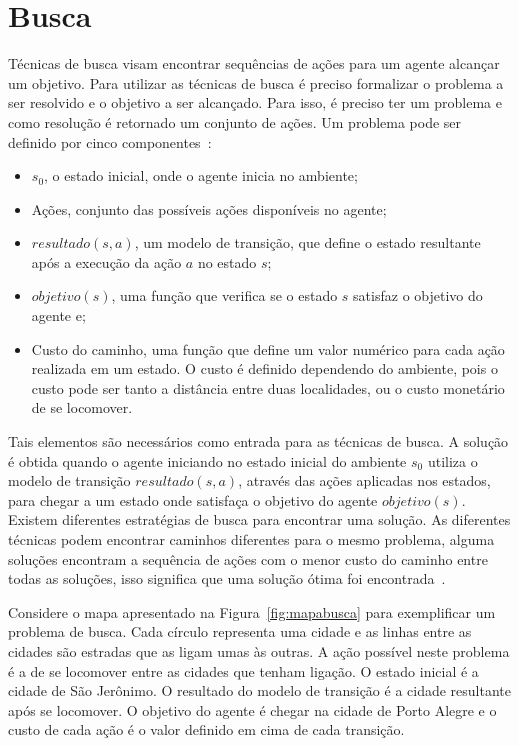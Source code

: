 \chapter{\label{chap:busca}Busca}

Técnicas de busca visam encontrar sequências de ações para um agente alcançar um objetivo.
Para utilizar as técnicas de busca é preciso formalizar o problema a ser resolvido e o objetivo a ser alcançado.
Para isso, é preciso ter um problema e como resolução é retornado um conjunto de ações.
Um problema pode ser definido por cinco componentes~\cite[Capítulo 3]{intelligence2003modern}: 

\begin{itemize}
	\item $s_{0}$, o estado inicial, onde o agente inicia no ambiente;
	\item Ações, conjunto das possíveis ações disponíveis no agente;
	\item $resultado(s, a)$, um modelo de transição, que define o estado resultante após a execução da ação $a$ no estado $s$;
	\item $objetivo(s)$, uma função que verifica se o estado $s$ satisfaz o objetivo do agente e; 
	\item Custo do caminho, uma função que define um valor numérico para cada ação realizada em um estado. O custo é definido dependendo do ambiente, pois o custo pode ser tanto a distância entre duas localidades, ou o custo monetário de se locomover. 
\end{itemize}   

Tais elementos são necessários como entrada para as técnicas de busca.
A solução é obtida quando o agente iniciando no estado inicial do ambiente $s_{0}$ utiliza o modelo de transição $resultado(s, a)$, através das ações aplicadas nos estados, para chegar a um estado onde satisfaça o objetivo do agente $objetivo(s)$.
Existem diferentes estratégias de busca para encontrar uma solução.
As diferentes técnicas podem encontrar caminhos diferentes para o mesmo problema, alguma soluções encontram a sequência de ações com o menor custo do caminho entre todas as soluções, isso significa que uma solução ótima foi encontrada~\cite[Capítulo 3]{intelligence2003modern}.

Considere o mapa apresentado na Figura~\ref{fig:mapabusca} para exemplificar um problema de busca.
Cada círculo representa uma cidade e as linhas entre as cidades são estradas que as ligam umas às outras. 
A ação possível neste problema é a de se locomover entre as cidades que tenham ligação.
O estado inicial é a cidade de São Jerônimo. O resultado do modelo de transição é a cidade resultante após se locomover. O objetivo do agente é chegar na cidade de Porto Alegre e o custo de cada ação é o valor definido em cima de cada transição. 

